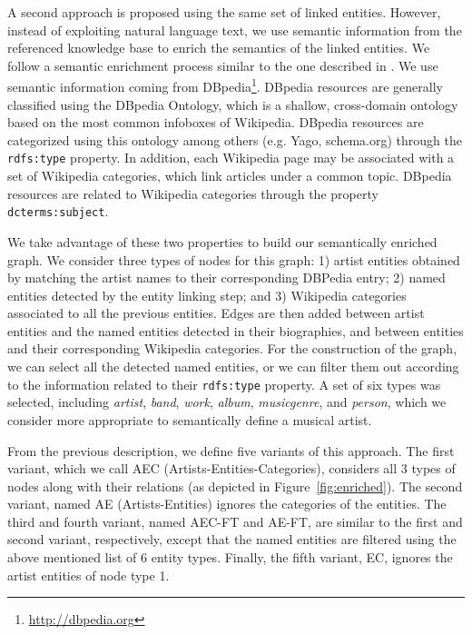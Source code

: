 A second approach is proposed using the same set of linked entities. However, instead of exploiting natural language text, we use semantic information from the referenced knowledge base to enrich the semantics of the linked entities. We follow a semantic enrichment process similar to the one described in \cite{Ostuni2015}. We use semantic information coming from DBpedia\footnote{\url{http://dbpedia.org}}. DBpedia resources are generally classified using the DBpedia Ontology, which is a shallow, cross-domain ontology based on the most common infoboxes of Wikipedia. DBpedia resources are categorized using this ontology among others (e.g. Yago, schema.org) through the \texttt{rdfs:type} property. In addition, each Wikipedia page may be associated with a set of Wikipedia categories, which link articles under a common topic. DBpedia resources are related to Wikipedia categories through the property \texttt{dcterms:subject}.

We take advantage of these two properties to build our semantically enriched graph.
We consider three types of nodes for this graph: 1) 	artist entities obtained by matching the artist names to their corresponding DBPedia entry; 2) named entities detected by the entity linking step; and 3) Wikipedia categories associated to all the previous entities.
Edges are then added between artist entities and the named entities detected in their biographies, and between entities and their corresponding Wikipedia categories.
For the construction of the graph, we can select all the detected named entities, or we can filter them out according to the information related to their \texttt{rdfs:type} property. A set of six types was selected, including \textit{artist}, \textit{band}, \textit{work}, \textit{album}, \textit{musicgenre}, and \textit{person}, which we consider more appropriate to semantically define a musical artist.

From the previous description, we define five variants of this approach. The first variant, which we call AEC (Artists-Entities-Categories), considers all 3 types of nodes along with their relations (as depicted in Figure~\ref{fig:enriched}). The second variant, named AE (Artists-Entities) ignores the categories of the entities. The third and fourth variant, named AEC-FT and AE-FT, are similar to the first and second variant, respectively, except that the named entities are filtered using the above mentioned list of 6 entity types. Finally, the fifth variant, EC, ignores the artist entities of node type 1.

